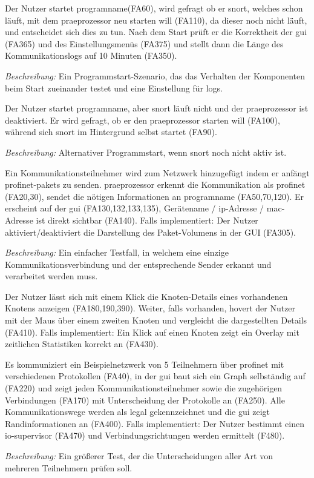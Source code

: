 \begin{description}[style=multiline, leftmargin=4cm, labelwidth=4cm]
 
   Der Nutzer startet \gls{programname}(FA60), wird gefragt ob er \gls{snort}, welches schon läuft, mit dem \gls{praeprozessor} neu starten will (FA110), da dieser noch nicht läuft, und entscheidet sich dies zu tun. Nach dem Start prüft er die Korrektheit der \gls{gui} (FA365) und des Einstellungsmenüs (FA375) und stellt dann die Länge des Kommunikationslogs auf 10 Minuten (FA350). \par
      \textit{Beschreibung:} Ein Programmstart-Szenario, das das Verhalten der Komponenten beim Start zueinander testet und eine Einstellung für \glspl{log}.
 
   Der Nutzer startet \gls{programname}, aber \gls{snort} läuft nicht und der \gls{praeprozessor} ist deaktiviert. Er wird gefragt, ob er den \gls{praeprozessor} starten will (FA100), während sich \gls{snort} im Hintergrund selbst startet (FA90). \par
      \textit{Beschreibung:} Alternativer Programmstart, wenn \gls{snort} noch nicht aktiv ist.
  
   Ein Kommunikationsteilnehmer wird zum Netzwerk hinzugefügt indem er anfängt \gls{profinet}-\glspl{paket} zu senden. \gls{praeprozessor} erkennt die Kommunikation als \gls{profinet} (FA20,30), sendet die nötigen Informationen an \gls{programname} (FA50,70,120). Er erscheint auf der \gls{gui} (FA130,132,133,135), Gerätename / \gls{ip}-Adresse / \gls{mac}-Adresse ist direkt sichtbar (FA140). Falls implementiert: Der Nutzer aktiviert/deaktiviert die Darstellung des Paket-Volumens in der GUI (FA305). \par
      \textit{Beschreibung:} Ein einfacher Testfall, in welchem eine einzige Kommunikationsverbindung und der entsprechende Sender erkannt und verarbeitet werden muss.
  
   Der Nutzer lässt sich mit einem Klick die Knoten-Details eines vorhandenen Knotens anzeigen (FA180,190,390). Weiter, falls vorhanden, hovert der Nutzer mit der Maus über einem zweiten Knoten und vergleicht die dargestellten Details (FA410). Falls implementiert: Ein Klick auf einen Knoten zeigt ein Overlay mit zeitlichen Statistiken korrekt an (FA430).
  
   Es kommuniziert ein Beispielnetzwerk von 5 Teilnehmern über \gls{profinet} mit verschiedenen Protokollen (FA40), in der \gls{gui} baut sich ein Graph selbständig auf (FA220) und zeigt jeden Kommunikationsteilnehmer sowie die zugehörigen Verbindungen (FA170) mit Unterscheidung der Protokolle an (FA250). Alle Kommunikationswege werden als legal gekennzeichnet und die \gls{gui} zeigt Randinformationen an (FA400). Falls implementiert: Der Nutzer bestimmt einen \gls{io-supervisor} (FA470) und Verbindungsrichtungen werden ermittelt (F480). \par
      \textit{Beschreibung:} Ein größerer Test, der die Unterscheidungen aller Art von mehreren Teilnehmern prüfen soll.
  

\end{description}
